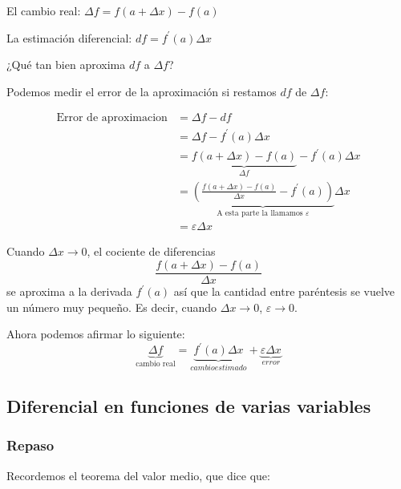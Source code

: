 \documentclass[12pt]{article}
\begin{document}
El cambio real: $ \Delta f = f(a + \Delta x) - f(a) $

La estimación diferencial: $ df = f^{\prime}(a)\Delta x $

¿Qué tan bien aproxima $ df $ a $ \Delta f $?

Podemos medir el error de la aproximación si restamos $ df $ de $ \Delta f $:

\begin{align*}
  \text{Error de aproximacion} &= \Delta f - df \\
   &= \Delta f - f^{\prime}(a)\Delta x\\
    &= \underbrace{f(a + \Delta x) - f(a)}_{\Delta f} - f^{\prime}(a)\Delta x\\
    &= \underbrace{\left(\frac{f(a + \Delta x) - f(a)}{\Delta x} - f^{\prime}(a)\right)}_{\text{A esta parte la llamamos }\varepsilon}\Delta x\\
     &= \varepsilon \Delta x
\end{align*}

Cuando $ \Delta x \to 0 $, el cociente de diferencias 
\[
\frac{f(a + \Delta x) - f(a)}{\Delta x}
\]
se aproxima a la derivada $ f^{\prime}(a) $ así que la cantidad entre paréntesis se vuelve un número muy pequeño. Es decir, cuando $ \Delta x \to 0 $, $ \varepsilon \to 0 $.

Ahora podemos afirmar lo siguiente:
\[
\underbrace{\Delta f}_{\text{cambio real}} = \underbrace{f^{\prime}(a)\Delta x}_{cambio estimado} + \underbrace{\varepsilon \Delta x}_{error}
\]


\subsection{Diferencial en funciones de varias variables}
\subsubsection{Repaso}
Recordemos el teorema del valor medio, que dice que:

\vspace{0.2cm}
\end{document}
